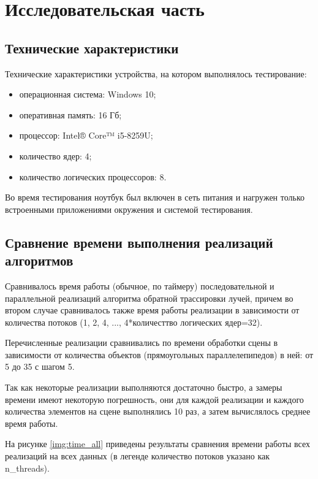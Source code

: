 \chapter{Исследовательская часть}

\section{Технические характеристики}

Технические характеристики устройства, на котором выполнялось тестирование:

\begin{itemize}
	\item операционная система: Windows 10;
	\item оперативная память: 16 Гб;
	\item процессор: Intel® Core™ i5-8259U;
	\item количество ядер: 4;
	\item количество логических процессоров: 8.
\end{itemize}

Во время тестирования ноутбук был включен в сеть питания и нагружен только встроенными приложениями окружения и системой тестирования.


\section{Сравнение времени выполнения реализаций алгоритмов}

Сравнивалось время работы (обычное, по таймеру) последовательной и параллельной реализаций алгоритма обратной трассировки лучей, причем во втором случае сравнивалось также время работы реализации в зависимости от количества потоков (1, 2, 4, ..., 4*количесттво логических ядер=32).

Перечисленные реализации сравнивались по времени обработки сцены в зависимости от количества объектов (прямоугольных параллелепипедов) в ней: от 5 до 35 с шагом 5. 
 
Так как некоторые реализации выполняются достаточно быстро, а замеры времени имеют некоторую погрешность, они для каждой реализации и каждого количества элементов на сцене выполнялись 10 раз, а затем вычислялось среднее время работы.
 

На рисунке \ref{img:time_all} приведены результаты сравнения времени работы всех реализаций на всех данных (в легенде количество потоков указано как n\_threads). 



